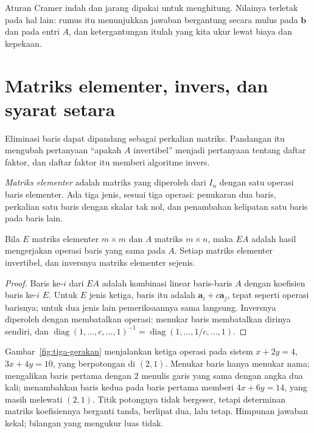 Aturan Cramer indah dan jarang dipakai untuk menghitung. Nilainya terletak pada hal lain:
rumus itu menunjukkan jawaban bergantung secara mulus pada $\mathbf{b}$ dan pada entri $A$,
dan ketergantungan itulah yang kita ukur lewat biaya dan kepekaan.

\section{Matriks elementer, invers, dan syarat setara}

Eliminasi baris dapat dipandang sebagai perkalian matriks. Pandangan itu mengubah pertanyaan
``apakah $A$ invertibel'' menjadi pertanyaan tentang daftar faktor, dan daftar faktor itu
memberi algoritme invers.


\begin{definisi}
\emph{Matriks elementer} adalah matriks yang diperoleh dari $I_{n}$ dengan satu operasi
baris elementer. Ada tiga jenis, sesuai tiga operasi: penukaran dua baris, perkalian satu
baris dengan skalar tak nol, dan penambahan kelipatan satu baris pada baris lain.
\end{definisi}

\begin{lemma}
Bila $E$ matriks elementer $m\times m$ dan $A$ matriks $m\times n$, maka $EA$ adalah hasil
mengerjakan operasi baris yang sama pada $A$. Setiap matriks elementer invertibel, dan
inversnya matriks elementer sejenis.
\end{lemma}

\begin{proof}
Baris ke-$i$ dari $EA$ adalah kombinasi linear baris-baris $A$ dengan koefisien baris ke-$i$
$E$. Untuk $E$ jenis ketiga, baris itu adalah $\mathbf{a}_{i}+c\mathbf{a}_{j}$, tepat seperti
operasi barisnya; untuk dua jenis lain pemeriksaannya sama langsung. Inversnya diperoleh
dengan membatalkan operasi: menukar baris membatalkan dirinya sendiri, dan
$\operatorname{diag}(1,\dots,c,\dots,1)^{-1}=\operatorname{diag}(1,\dots,1/c,\dots,1)$.
\end{proof}

Gambar~\ref{fig:tiga-gerakan} menjalankan ketiga operasi pada sistem $x+2y=4$,
$3x+4y=10$, yang berpotongan di $(2,1)$. Menukar baris hanya menukar nama; mengalikan baris
pertama dengan $2$ menulis garis yang sama dengan angka dua kali; menambahkan baris kedua pada
baris pertama memberi $4x+6y=14$, yang masih melewati $(2,1)$. Titik potongnya tidak bergeser,
tetapi determinan matriks koefisiennya berganti tanda, berlipat dua, lalu tetap. Himpunan
jawaban kekal; bilangan yang mengukur luas tidak.


